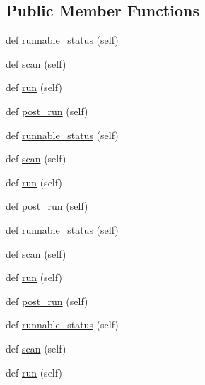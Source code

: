 \subsection*{Public Member Functions}
\begin{DoxyCompactItemize}
\item 
def \hyperlink{classwaflib_1_1extras_1_1doxygen_1_1doxygen_a9296bc8174969eb9d34a207086b25979}{runnable\+\_\+status} (self)
\item 
def \hyperlink{classwaflib_1_1extras_1_1doxygen_1_1doxygen_a429bd9d2361167ffbe527e4dd944bf38}{scan} (self)
\item 
def \hyperlink{classwaflib_1_1extras_1_1doxygen_1_1doxygen_adfbde18b61a6ae5e0af7ff252af4dcf5}{run} (self)
\item 
def \hyperlink{classwaflib_1_1extras_1_1doxygen_1_1doxygen_a62a09f0a46cbab7cffab4ab496c46e80}{post\+\_\+run} (self)
\item 
def \hyperlink{classwaflib_1_1extras_1_1doxygen_1_1doxygen_a9296bc8174969eb9d34a207086b25979}{runnable\+\_\+status} (self)
\item 
def \hyperlink{classwaflib_1_1extras_1_1doxygen_1_1doxygen_a429bd9d2361167ffbe527e4dd944bf38}{scan} (self)
\item 
def \hyperlink{classwaflib_1_1extras_1_1doxygen_1_1doxygen_adfbde18b61a6ae5e0af7ff252af4dcf5}{run} (self)
\item 
def \hyperlink{classwaflib_1_1extras_1_1doxygen_1_1doxygen_a62a09f0a46cbab7cffab4ab496c46e80}{post\+\_\+run} (self)
\item 
def \hyperlink{classwaflib_1_1extras_1_1doxygen_1_1doxygen_a9296bc8174969eb9d34a207086b25979}{runnable\+\_\+status} (self)
\item 
def \hyperlink{classwaflib_1_1extras_1_1doxygen_1_1doxygen_a429bd9d2361167ffbe527e4dd944bf38}{scan} (self)
\item 
def \hyperlink{classwaflib_1_1extras_1_1doxygen_1_1doxygen_adfbde18b61a6ae5e0af7ff252af4dcf5}{run} (self)
\item 
def \hyperlink{classwaflib_1_1extras_1_1doxygen_1_1doxygen_a62a09f0a46cbab7cffab4ab496c46e80}{post\+\_\+run} (self)
\item 
def \hyperlink{classwaflib_1_1extras_1_1doxygen_1_1doxygen_a9296bc8174969eb9d34a207086b25979}{runnable\+\_\+status} (self)
\item 
def \hyperlink{classwaflib_1_1extras_1_1doxygen_1_1doxygen_a429bd9d2361167ffbe527e4dd944bf38}{scan} (self)
\item 
def \hyperlink{classwaflib_1_1extras_1_1doxygen_1_1doxygen_adfbde18b61a6ae5e0af7ff252af4dcf5}{run} (self)

\end{DoxyCompactItemize}
